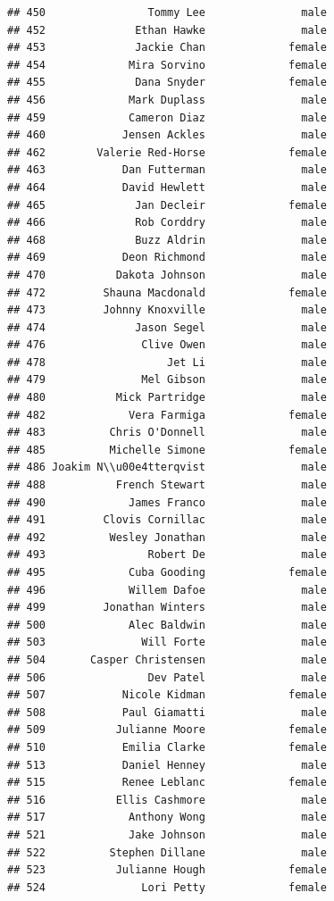 \documentclass[
]{article}
\begin{document}
\begin{verbatim}
## 450                Tommy Lee               male
## 452              Ethan Hawke               male
## 453              Jackie Chan             female
## 454             Mira Sorvino             female
## 455              Dana Snyder             female
## 456             Mark Duplass               male
## 459             Cameron Diaz               male
## 460            Jensen Ackles               male
## 462        Valerie Red-Horse             female
## 463            Dan Futterman               male
## 464            David Hewlett               male
## 465              Jan Decleir             female
## 466              Rob Corddry               male
## 468              Buzz Aldrin               male
## 469            Deon Richmond               male
## 470           Dakota Johnson               male
## 472         Shauna Macdonald             female
## 473         Johnny Knoxville               male
## 474              Jason Segel               male
## 476               Clive Owen               male
## 478                   Jet Li               male
## 479               Mel Gibson               male
## 480           Mick Partridge               male
## 482             Vera Farmiga             female
## 483          Chris O'Donnell               male
## 485          Michelle Simone             female
## 486 Joakim N\\u00e4tterqvist               male
## 488           French Stewart               male
## 490             James Franco               male
## 491         Clovis Cornillac               male
## 492          Wesley Jonathan               male
## 493                Robert De               male
## 495             Cuba Gooding             female
## 496             Willem Dafoe               male
## 499         Jonathan Winters               male
## 500             Alec Baldwin               male
## 503               Will Forte               male
## 504       Casper Christensen               male
## 506                Dev Patel               male
## 507            Nicole Kidman             female
## 508            Paul Giamatti               male
## 509           Julianne Moore             female
## 510            Emilia Clarke             female
## 513            Daniel Henney               male
## 515            Renee Leblanc             female
## 516           Ellis Cashmore               male
## 517             Anthony Wong               male
## 521             Jake Johnson               male
## 522          Stephen Dillane               male
## 523           Julianne Hough             female
## 524               Lori Petty             female

\end{verbatim}
\end{document}
